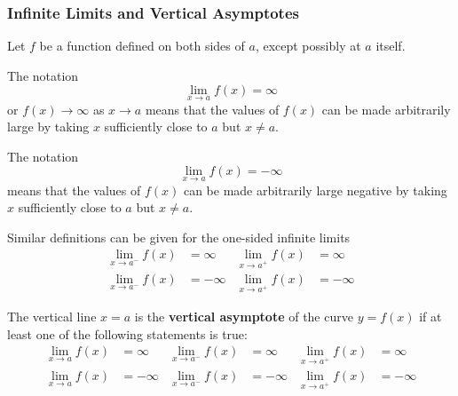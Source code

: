 \subsubsection*{Infinite Limits and Vertical Asymptotes}
Let \(f\) be a function defined on both sides of \(a\),
except possibly at \(a\) itself.
\begin{definition}
    The notation
    \[\lim_{x\to a}f(x)=\infty\]
    or \(f(x)\to\infty\) as \(x\to a\) means that the values of \(f(x)\) can
    be made arbitrarily large by taking \(x\) sufficiently close to \(a\) but
    \(x\neq a\).
\end{definition}
\begin{definition}
    The notation
    \[\lim_{x\to a}f(x)=-\infty\]
    means that the values of \(f(x)\) can be made arbitrarily large negative
    by taking \(x\) sufficiently close to \(a\) but \(x\neq a\).
\end{definition}
Similar definitions can be given for the one-sided infinite limits
\begin{align*}
    \lim_{x\to a^-}f(x) &= \infty & \lim_{x\to a^+}f(x) &= \infty \\
    \lim_{x\to a^-}f(x) &= -\infty & \lim_{x\to a^+}f(x) &= -\infty
\end{align*}
\begin{definition}
    The vertical line \(x=a\) is the \textbf{vertical asymptote} of the curve
    \(y=f(x)\) if at least one of the following statements is true:
    \begin{align*}
        \lim_{x\to a}f(x) &= \infty & \lim_{x\to a^-}f(x) &= \infty
        & \lim_{x\to a^+}f(x) &= \infty \\
        \lim_{x\to a}f(x) &= -\infty & \lim_{x\to a^-}f(x) &= -\infty
        & \lim_{x\to a^+}f(x) &= -\infty
    \end{align*}
\end{definition}